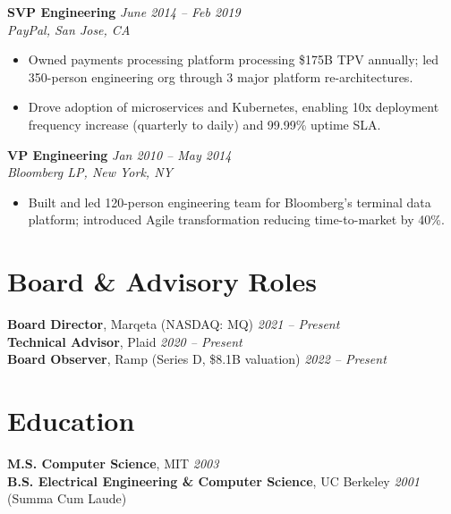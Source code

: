 \documentclass[11pt,a4paper]{article}
\begin{document}
\vspace{6pt}
\noindent\textbf{SVP Engineering} \hfill \textit{June 2014 -- Feb 2019}\\
\textit{PayPal, San Jose, CA}
\begin{itemize}
  \item Owned payments processing platform processing \$175B TPV annually; led 350-person engineering org through 3 major platform re-architectures.
  \item Drove adoption of microservices and Kubernetes, enabling 10x deployment frequency increase (quarterly to daily) and 99.99\% uptime SLA.
\end{itemize}

\vspace{6pt}
\noindent\textbf{VP Engineering} \hfill \textit{Jan 2010 -- May 2014}\\
\textit{Bloomberg LP, New York, NY}
\begin{itemize}
  \item Built and led 120-person engineering team for Bloomberg's terminal data platform; introduced Agile transformation reducing time-to-market by 40\%.
\end{itemize}

\section{Board \& Advisory Roles}
\noindent\textbf{Board Director}, Marqeta (NASDAQ: MQ) \hfill \textit{2021 -- Present}\\
\noindent\textbf{Technical Advisor}, Plaid \hfill \textit{2020 -- Present}\\
\noindent\textbf{Board Observer}, Ramp (Series D, \$8.1B valuation) \hfill \textit{2022 -- Present}

\section{Education}
\textbf{M.S. Computer Science}, MIT \hfill \textit{2003}\\
\textbf{B.S. Electrical Engineering \& Computer Science}, UC Berkeley \hfill \textit{2001} \quad (Summa Cum Laude)
\end{document}

